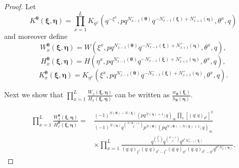 \documentclass{ximera}
\begin{document}
\begin{proof}
Let 
\begin{equation*}
    K^{\boldsymbol\theta}(\boldsymbol\xi,\boldsymbol\eta)=\prod_{x=1}^LK_{\eta^x}\left(q^{-\xi^x},pq^{N_{x-1}^-(\boldsymbol\theta)}q^{-N_{x-1}^-(\boldsymbol\xi)+N_{x+1}^+(\boldsymbol\eta)},\theta^x,q\right)
\end{equation*}
and moreover define
\begin{equation*}
    W^{\boldsymbol\theta}_x(\boldsymbol\xi,\boldsymbol\eta)=W(\xi^x,pq^{N^{-}_{x-1}(\boldsymbol\theta)}q^{-N_{x-1}^-(\boldsymbol\xi)+N_{x+1}^+(\boldsymbol\eta)},\theta^x,q),
\end{equation*}
\begin{equation*}
   H^{\boldsymbol\theta}_x(\boldsymbol\xi,\boldsymbol\eta)=H(\eta^x,pq^{N^{-}_{x-1}(\boldsymbol\theta)}q^{-N_{x-1}^-(\boldsymbol\xi)+N_{x+1}^+(\boldsymbol\eta)},\theta^x,q),
\end{equation*}
\begin{equation*}
    K^{\boldsymbol\theta}_x(\boldsymbol\xi,\boldsymbol\eta)=K_{\eta^x}(\xi^x,pq^{N^{-}_{x-1}(\boldsymbol\theta)}q^{-N_{x-1}^-(\boldsymbol\xi)+N_{x+1}^+(\boldsymbol\eta)},\theta^x,q).
\end{equation*}

Next we show that  $\prod_{x=1}^L\frac{W_x(\boldsymbol\xi,\boldsymbol\eta)}{ H_x(\boldsymbol\xi,\boldsymbol\eta)}$  can be written as $\frac{w_{\boldsymbol\theta}(\boldsymbol\xi)}{h_{\boldsymbol\theta}(\boldsymbol\eta)}$.

\begin{align*} \prod_{x=1}^L\frac{W^{\boldsymbol\theta}_x(\boldsymbol\xi,\boldsymbol\eta)}{ H^{\boldsymbol\theta}_x(\boldsymbol\xi,\boldsymbol\eta)}=& \frac{(-1)^{N(\boldsymbol\theta)-N(\boldsymbol\xi)}\left(pq^{N(\boldsymbol\eta)+1};q\right)_\infty\prod_x[(q;q)_{\theta^x}]^{2}}{(-1)^{N(\boldsymbol\eta)}q^{\binom{N(\boldsymbol\theta)+1}{2}}p^{N(\boldsymbol\theta)}\left(pq^{N(\boldsymbol\theta) -N(\boldsymbol\xi)+1};q\right)_\infty }\\
&\times\prod_{x=1}^L\frac{q^{\binom{\xi^x}{2}}q^{\binom{\eta^x+1}{2}}q^{\theta^x N_{x-1}^-(\boldsymbol\xi)}}{(q;q)_{\xi^x}(q;q)_{\theta^x-\xi^x}(q;q)_{\eta^x}(q;q)_{\theta^x-\eta^x}q^{\theta^x N_{x}^+(\boldsymbol\eta)}}.  
\end{align*}
 



\end{proof}
\end{document}
